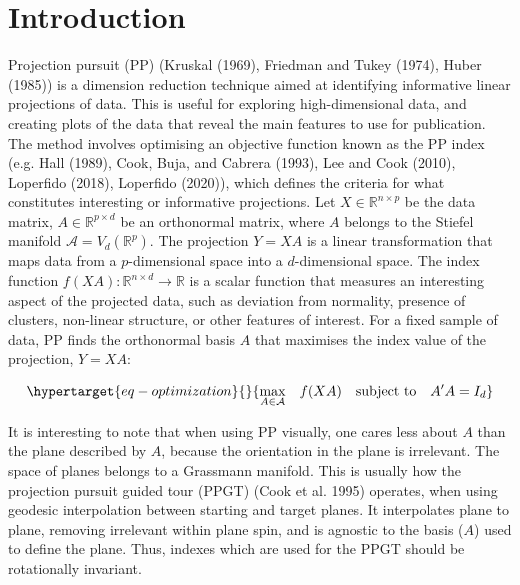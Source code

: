 \documentclass[
  12pt,
]{interact}
\theoremstyle{plain}
\begin{document}
\hypertarget{introduction}{%
\section{Introduction}\label{introduction}}

Projection pursuit (PP) (Kruskal (1969), Friedman and Tukey (1974),
Huber (1985)) is a dimension reduction technique aimed at identifying
informative linear projections of data. This is useful for exploring
high-dimensional data, and creating plots of the data that reveal the
main features to use for publication. The method involves optimising an
objective function known as the PP index (e.g. Hall (1989), Cook, Buja,
and Cabrera (1993), Lee and Cook (2010), Loperfido (2018), Loperfido
(2020)), which defines the criteria for what constitutes interesting or
informative projections. Let \(X \in \mathbb{R}^{n\times p}\) be the
data matrix, \(A \in\mathbb{R}^{p \times d}\) be an orthonormal matrix,
where \(A\) belongs to the Stiefel manifold
\(\mathcal{A} = V_d(\mathbb{R}^p)\). The projection \(Y = XA\) is a
linear transformation that maps data from a \(p\)-dimensional space into
a \(d\)-dimensional space. The index function
\(f(XA): \mathbb{R}^{n \times d} \to \mathbb{R}\) is a scalar function
that measures an interesting aspect of the projected data, such as
deviation from normality, presence of clusters, non-linear structure, or
other features of interest. For a fixed sample of data, PP finds the
orthonormal basis \(A\) that maximises the index value of the
projection, \(Y = XA\):

\begin{equation}\protect\hypertarget{eq-optimization}{}{
\underset{A \in \mathcal{A}}{\max } \quad f(XA) \quad \text{subject to} \quad A'A = I_d
}\label{eq-optimization}\end{equation}

It is interesting to note that when using PP visually, one cares less
about \(A\) than the plane described by \(A\), because the orientation
in the plane is irrelevant. The space of planes belongs to a Grassmann
manifold. This is usually how the projection pursuit guided tour (PPGT)
(Cook et al. 1995) operates, when using geodesic interpolation between
starting and target planes. It interpolates plane to plane, removing
irrelevant within plane spin, and is agnostic to the basis (\(A\)) used
to define the plane. Thus, indexes which are used for the PPGT should be
rotationally invariant.
\end{document}
